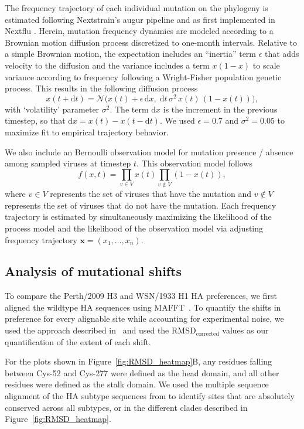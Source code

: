 \documentclass[9pt,twocolumn,twoside]{pnas-new-for-biorxiv}
\begin{document}
{%
\newcommand{\dx}{\mathrm{d}x}						%
\newcommand{\dy}{\mathrm{d}y}						%
\newcommand{\dt}{\mathrm{d}t}						%
\newcommand{\inertia}{\epsilon}			    %
\newcommand{\normal}{\mathcal{N}}				%

The frequency trajectory of each individual mutation on the phylogeny is estimated following Nextstrain's augur pipeline and as first implemented in Nextflu \cite{neher2015nextflu}.
Herein, mutation frequency dynamics are modeled according to a Brownian motion diffusion process discretized to one-month intervals.
Relative to a simple Brownian motion, the expectation includes an ``inertia'' term $\inertia$ that adds velocity to the diffusion and the variance includes a term $x(1-x)$ to scale variance according to frequency following a Wright-Fisher population genetic process.
This results in the following diffusion process
\begin{equation}
x(t+\dt) = \normal\big( x(t) + \inertia \, \dx , \; \dt \, \sigma^2 \, x(t) \, (1-x(t)) \big),
\end{equation}
with `volatility' parameter $\sigma^2$.
The term $\dx$ is the increment in the previous timestep, so that $\dx = x(t) - x(t-\dt)$.
We used $\inertia = 0.7$ and $\sigma^2 = 0.05$ to maximize fit to empirical trajectory behavior.

We also include an Bernoulli observation model for mutation presence / absence among sampled viruses at timestep $t$.
This observation model follows
\begin{equation}
f(x,t) = \prod_{v\in V} x(t) \prod_{v\notin V} (1-x(t)),
\end{equation}
where $v\in V$ represents the set of viruses that have the mutation and $v\notin V$ represents the set of viruses that do not have the mutation.
Each frequency trajectory is estimated by simultaneously maximizing the likelihood of the process model and the likelihood of the observation model via adjusting frequency trajectory $\mathbf{x}=(x_1, \ldots, x_n)$.


\subsection*{Analysis of mutational shifts}
To compare the Perth/2009 H3 and WSN/1933 H1 HA preferences, we first aligned the wildtype HA sequences using MAFFT~\cite{katoh2013mafft}.
To quantify the shifts in preference for every alignable site while accounting for experimental noise, we used the approach described in~\cite{haddox2018mapping} and used the RMSD$_{\text{corrected}}$ values as our quantification of the extent of each shift.

For the plots shown in Figure~\ref{fig:RMSD_heatmap}B, any residues falling between Cys-52 and Cys-277 were defined as the head domain, and all other residues were defined as the stalk domain.
We used the multiple sequence alignment of the HA subtype sequences from \cite{doud2018quantifying} to identify sites that are absolutely conserved across all subtypes, or in the different clades described in Figure~\ref{fig:RMSD_heatmap}.

}
\end{document}
